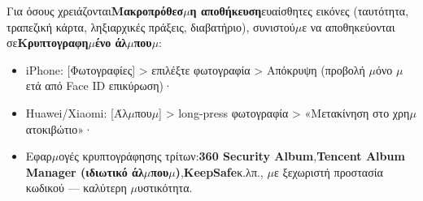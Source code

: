 Για όσους χρειάζονται\textbf{Μακροπρόθεσ$\mu$η αποθήκευση}ευαίσθητες εικόνες (ταυτότητα, τραπεζική κάρτα, ληξιαρχικές πράξεις, διαβατήριο), συνιστού$\mu$ε να αποθηκεύονται σε\textbf{Κρυπτογραφη$\mu$ένο άλ$\mu$που$\mu$}:

\begin{itemize}
  \item iPhone: [Φωτογραφίες] > επιλέξτε φωτογραφία > Απόκρυψη (προβολή $\mu$όνο $\mu$ετά από Face ID επικύρωση)·
  \item Huawei/Xiaomi: [Άλ$\mu$που$\mu$] > long-press φωτογραφία > «Μετακίνηση στο χρη$\mu$ατοκιβώτιο»·
  \item Εφαρ$\mu$ογές κρυπτογράφησης τρίτων:\textbf{360 Security Album},\textbf{Tencent Album Manager (ιδιωτικό άλ$\mu$που$\mu$)},\textbf{KeepSafe}κ.λπ., $\mu$ε ξεχωριστή προστασία κωδικού — καλύτερη $\mu$υστικότητα.
\end{itemize}
